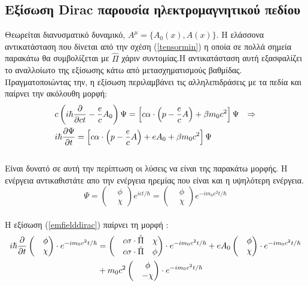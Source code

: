 \subsection{Eξίσωση \textlatin{Dirac} παρουσία ηλεκτρομαγνητικού πεδίου}
Θεωρείται διανυσματικό δυναμικό, $A^{\mu} = \{ A_0(x),A(x)\}$. Η ελάσσονα αντικατάσταση που δίνεται από την σχέση (\ref{tensormin}) η οποία σε πολλά σημεία παρακάτω θα συμβολίζεται με $\hat{\Pi}$ χάριν συντομίας.H αντικατάσταση αυτή εξασφαλίζει το  αναλλοίωτο της εξίσωσης  κάτω από μετασχηματισμούς  βαθμίδας. Πραγματοποιώντας την, η εξίσωση περιλαμβάνει τις αλληλεπιδράσεις με τα πεδία και παίρνει την ακόλουθη μορφή:\\
\begin{align}
  \notag &c \left(  i\hbar \frac{\partial }{\partial ct}-\frac{e}{c}A_0 \right)  \Psi =\left[  c\alpha \cdot \left(  p- \frac{e}{c} A\right)  +\beta m_0 c^2 \right]  \Psi &\Rightarrow \\
  &  i\hbar \frac{\partial \Psi}{\partial t} =\left[  c\alpha \cdot \left(  p- \frac{e}{c} A\right)  +eA_0 +\beta m_0 c^2 \right]  \Psi
  \label{emfielddirac}
\end{align}\\
Είναι δυνατό σε αυτή την περίπτωση οι λύσεις να είναι της παρακάτω μορφής. Η ενέργεια αντικαθιστάτε απο την ενέργεια ηρεμίας που είναι και η υψηλότερη ενέργεια.
\begin{equation*}
  \Psi= 
  \begin{pmatrix}
    &\phi \\
    &\chi
  \end{pmatrix}
  e^{i\epsilon t/\hbar}= 
  \begin{pmatrix}
    &\phi \\
    &\chi
  \end{pmatrix}
  e^{-i m_0 c^2 t / \hbar}
\end{equation*}\\
Η εξίσωση  (\ref{emfielddirac}) παίρνει τη μορφή :\\ 
\begin{equation}
  \begin{split}
  i\hbar \frac{\partial }{\partial t} 
  \begin{pmatrix}
    &\phi\\
    &\chi
  \end{pmatrix} 
  \cdot e^{-i m_0 c^2 t / \hbar} &= 
  \begin{pmatrix}
    &c \sigma \cdot \hat{\Pi}  &\chi \\
    &c \sigma \cdot \hat{\Pi}  &\phi
  \end{pmatrix} 
  \cdot e^{-i m_0 c^2 t / \hbar}
  + e A_0
  \begin{pmatrix}
    &\phi\\
    &\chi
  \end{pmatrix}
  \cdot e^{-i m_0 c^2 t / \hbar}\\
   &+m_0 c^2 
  \begin{pmatrix}
    &\phi\\
    &-\chi
  \end{pmatrix}
  \cdot e^{-i m_0 c^2 t / \hbar}
  \end{split}
  \label{direq1}
\end{equation}\\
